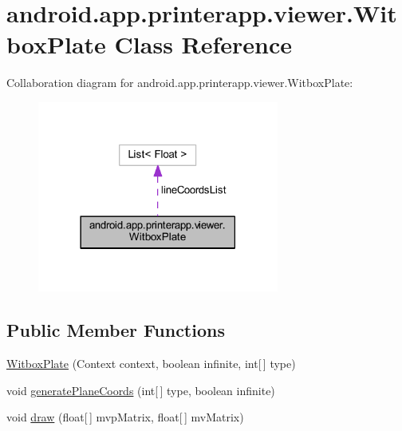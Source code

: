 \hypertarget{classandroid_1_1app_1_1printerapp_1_1viewer_1_1_witbox_plate}{}\section{android.\+app.\+printerapp.\+viewer.\+Witbox\+Plate Class Reference}
\label{classandroid_1_1app_1_1printerapp_1_1viewer_1_1_witbox_plate}


Collaboration diagram for android.\+app.\+printerapp.\+viewer.\+Witbox\+Plate\+:
\nopagebreak
\begin{figure}[H]
\begin{center}
\leavevmode
\includegraphics[width=225pt]{classandroid_1_1app_1_1printerapp_1_1viewer_1_1_witbox_plate__coll__graph}
\end{center}
\end{figure}
\subsection*{Public Member Functions}
\begin{DoxyCompactItemize}
\item 
\hyperlink{classandroid_1_1app_1_1printerapp_1_1viewer_1_1_witbox_plate_a71f02c1c730bc0433e768e4d5475c497}{Witbox\+Plate} (Context context, boolean infinite, int\mbox{[}$\,$\mbox{]} type)
\item 
void \hyperlink{classandroid_1_1app_1_1printerapp_1_1viewer_1_1_witbox_plate_acf24ac545a858ec78b08e9e12b2f7f10}{generate\+Plane\+Coords} (int\mbox{[}$\,$\mbox{]} type, boolean infinite)
\item 
void \hyperlink{classandroid_1_1app_1_1printerapp_1_1viewer_1_1_witbox_plate_a0e15801e297797fb07e3f3f660e23aa3}{draw} (float\mbox{[}$\,$\mbox{]} mvp\+Matrix, float\mbox{[}$\,$\mbox{]} mv\+Matrix)
\end{DoxyCompactItemize}
